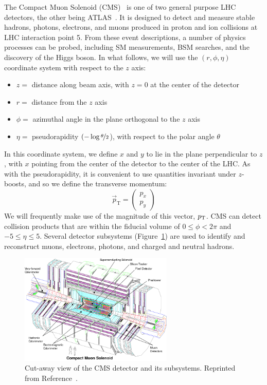 The Compact Muon Solenoid (CMS)~\cite{cmsjinst} is one of two general purpose LHC detectors, the other being ATLAS~\cite{atlasjinst}.
It is designed to detect and measure stable hadrons, photons, electrons, and muons produced in proton and ion collisions at LHC interaction point 5. 
From these event descriptions, a number of physics processes can be probed, including SM measurements, BSM searches, and the discovery of the Higgs boson. 
In what follows, we will use the $(r,\phi,\eta)$ coordinate system with respect to the $z$ axis:
\begin{itemize}
    \setlength\itemsep{1pt}
    \item $z = $ distance along beam axis, with $z=0$ at the center of the detector
    \item $r = $ distance from the $z$ axis
    \item $\phi = $ azimuthal angle in the plane orthogonal to the $z$ axis
    \item $\eta = $ pseudorapidity $(-\log\nicefrac{\theta}{2}$), with respect to the polar angle $\theta$ 
\end{itemize}
In this coordinate system, we define $x$ and $y$ to lie in the plane perpendicular to $z$, with $x$ pointing from the center of the detector to the center of the LHC.
As with the pseudorapidity, it is convenient to use quantities invariant under $z$-boosts, and so we define the transverse momentum:
\begin{equation}
    \vec{p}_\mathrm{T} = \left(\begin{matrix} p_x \\ p_y \end{matrix}\right)
\end{equation}
We will frequently make use of the magnitude of this vector, $p_\mathrm{T}$. 
CMS can detect collision products that are within the fiducial volume of $0 \leq \phi < 2\pi$ and $-5 \leq \eta\leq 5$. 
Several detector subsystems (Figure~\ref{fig:cms:cms}) are used to identify and reconstruct muons, electrons, photons, and charged and neutral hadrons. 

\begin{figure}[]
    \begin{center}
        \includegraphics[width=0.65\textwidth]{figures/cms/cms.png}
        \caption{Cut-away view of the CMS detector and its subsystems.
                 Reprinted from Reference~\cite{cmsjinst}.}
        \label{fig:cms:cms}
    \end{center}
\end{figure}

